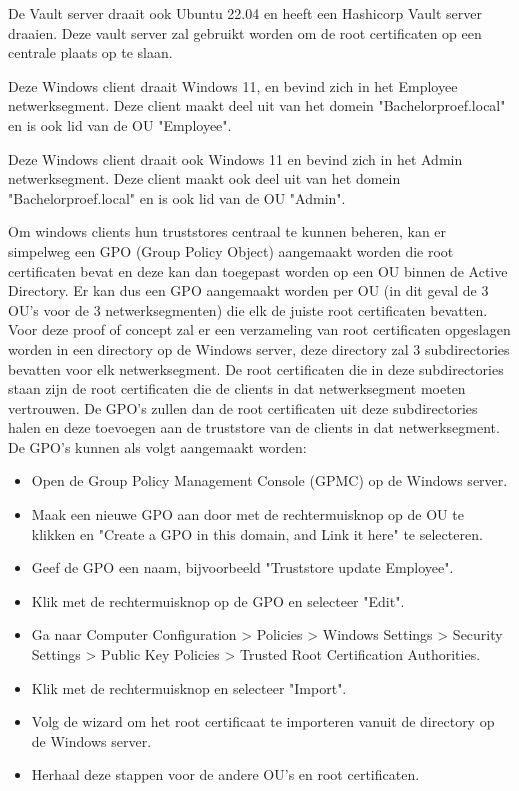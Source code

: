 \label{sec:Vault}
De Vault server draait ook Ubuntu 22.04 en heeft een Hashicorp Vault server draaien. Deze vault server zal gebruikt worden om de root certificaten op een centrale plaats op te slaan.

\label{sec:Windows client 1}
Deze Windows client draait Windows 11, en bevind zich in het Employee netwerksegment. Deze client maakt deel uit van het domein "Bachelorproef.local" en is ook lid van de OU "Employee".

\label{sec:Windows client 2}
Deze Windows client draait ook Windows 11 en bevind zich in het Admin netwerksegment. Deze client maakt ook deel uit van het domein "Bachelorproef.local" en is ook lid van de OU "Admin".

\label{sec:Oplossing voor Windows end-points}
Om windows clients hun truststores centraal te kunnen beheren, kan er simpelweg een GPO (Group Policy Object) aangemaakt worden die root certificaten bevat en deze kan dan toegepast worden op een OU binnen de Active Directory.
Er kan dus een GPO aangemaakt worden per OU (in dit geval de 3 OU's voor de 3 netwerksegmenten) die elk de juiste root certificaten bevatten.
Voor deze proof of concept zal er een verzameling van root certificaten opgeslagen worden in een directory op de Windows server, deze directory zal 3 subdirectories bevatten voor elk netwerksegment. De root certificaten die in deze subdirectories staan zijn de root certificaten die de clients in dat netwerksegment moeten vertrouwen.
De GPO's zullen dan de root certificaten uit deze subdirectories halen en deze toevoegen aan de truststore van de clients in dat netwerksegment.
De GPO's kunnen als volgt aangemaakt worden:
\begin{itemize}
    \item Open de Group Policy Management Console (GPMC) op de Windows server.
    \item Maak een nieuwe GPO aan door met de rechtermuisknop op de OU te klikken en "Create a GPO in this domain, and Link it here" te selecteren.
    \item Geef de GPO een naam, bijvoorbeeld "Truststore update Employee".
    \item Klik met de rechtermuisknop op de GPO en selecteer "Edit".
    \item Ga naar Computer Configuration > Policies > Windows Settings > Security Settings > Public Key Policies > Trusted Root Certification Authorities.
    \item Klik met de rechtermuisknop en selecteer "Import".
    \item Volg de wizard om het root certificaat te importeren vanuit de directory op de Windows server.
    \item Herhaal deze stappen voor de andere OU's en root certificaten.
\end{itemize}

